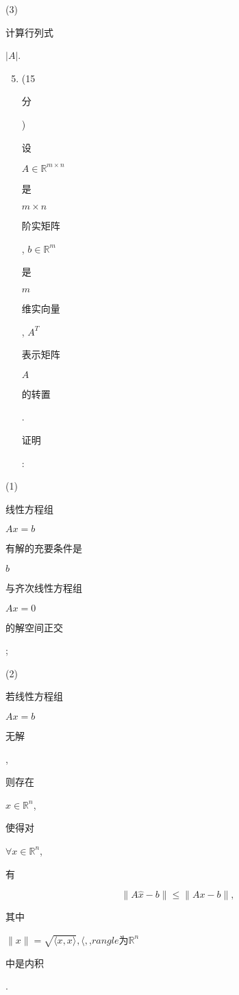 \documentclass[10pt]{article}
\begin{document}
(3) \begin{CJK}{UTF8}{mj}计算行列式\end{CJK} $|A|$.

\begin{enumerate}
  \setcounter{enumi}{4}
  \item (15 \begin{CJK}{UTF8}{mj}分\end{CJK}) \begin{CJK}{UTF8}{mj}设\end{CJK} $A \in \mathbb{R}^{m \times n}$ \begin{CJK}{UTF8}{mj}是\end{CJK} $m \times n$ \begin{CJK}{UTF8}{mj}阶实矩阵\end{CJK}, $b \in \mathbb{R}^{m}$ \begin{CJK}{UTF8}{mj}是\end{CJK} $m$ \begin{CJK}{UTF8}{mj}维实向量\end{CJK}, $A^{T}$ \begin{CJK}{UTF8}{mj}表示矩阵\end{CJK} $A$ \begin{CJK}{UTF8}{mj}的转置\end{CJK}. \begin{CJK}{UTF8}{mj}证明\end{CJK}:
\end{enumerate}
(1) \begin{CJK}{UTF8}{mj}线性方程组\end{CJK} $A x=b$ \begin{CJK}{UTF8}{mj}有解的充要条件是\end{CJK} $b$ \begin{CJK}{UTF8}{mj}与齐次线性方程组\end{CJK} $A x=0$ \begin{CJK}{UTF8}{mj}的解空间正交\end{CJK};

(2) \begin{CJK}{UTF8}{mj}若线性方程组\end{CJK} $A x=b$ \begin{CJK}{UTF8}{mj}无解\end{CJK}, \begin{CJK}{UTF8}{mj}则存在\end{CJK} $\widehat{x} \in \mathbb{R}^{n}$, \begin{CJK}{UTF8}{mj}使得对\end{CJK} $\forall x \in \mathbb{R}^{n}$, \begin{CJK}{UTF8}{mj}有\end{CJK}
$$
\|A \widehat{x}-b\| \leqslant\|A x-b\|,
$$
\begin{CJK}{UTF8}{mj}其中\end{CJK} $\|x\|=\sqrt{\langle x, x\rangle},\langle,$,$rangle 为 \mathbb{R}^{n}$ \begin{CJK}{UTF8}{mj}中是内积\end{CJK}.
\end{document}
